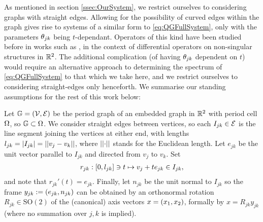 As mentioned in section \ref{ssec:OurSystem}, we restrict ourselves to considering graphs with straight edges.
Allowing for the possibility of curved edges within the graph gives rise to systems of a similar form to \eqref{eq:QGFullSystem}, only with the parameters $\theta_{jk}$ being $t$-dependant.
Operators of this kind have been studied before in works such as \cite{shterenberg2007homogenization}, in the context of differential operators on non-singular structures in $\mathbb{R}^2$.
The additional complication (of having $\theta_{jk}$ dependent on $t$) would require an alternative approach to determining the spectrum of \eqref{eq:QGFullSystem} to that which we take here, and we restrict ourselves to considering straight-edges only henceforth.
We summarise our standing assumptions for the rest of this work below:
\begin{assumption} \label{ass:MeasTheoryProblemSetup}
	Let $\mathbb{G}=\left( \mathcal{V},\mathcal{E} \right)$ be the period graph of an embedded graph in $\mathbb{R}^2$ with period cell $\Omega$, so $\mathbb{G}\subset\Omega$.
	We consider straight edges between vertices, so each $I_{jk}\in \mathcal{E}$ is the line segment joining the vertices at either end, with lengths $l_{jk} = \left\lvert I_{jk} \right\rvert = \lvert\lvert v_j-v_k \rvert\rvert$, where $\lvert\lvert \cdot \rvert\rvert$ stands for the Euclidean length.
	Let $e_{jk}$ be the unit vector parallel to $I_{jk}$ and directed from $v_j$ to $v_k$.
	Set
	\begin{align} \label{eq:EdgeParameterisation}
	r_{jk}:\left[ 0, l_{jk} \right] \ni t \mapsto v_j + te_{jk} \in I_{jk},
	\end{align}
	and note that $r_{jk}'(t) = e_{jk}$.
	Finally, let $n_{jk}$ be the unit normal to $I_{jk}$ so the frame $y_{jk} := \left( e_{jk}, n_{jk} \right)$ can be obtained by an orthonormal rotation $R_{jk}\in\mathrm{SO}(2)$ of the (canonical) axis vectors $x = \left( x_1, x_2 \right)$, formally by $x = R_{jk}y_{jk}$ (where no summation over $j,k$ is implied).
\end{assumption}

